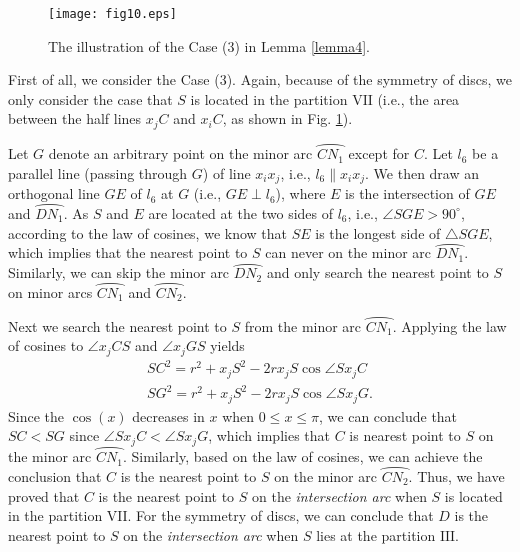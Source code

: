 \documentclass[journal]{IEEEtran}
\begin{document}
\begin{IEEEproof}
\begin{figure}
\begin{center}
\texttt{[image: fig10.eps]}    \caption{The illustration of the Case (3) in Lemma \ref{lemma4}.}
\label{fig10}                                 \end{center}                                 \end{figure}
First of all, we consider the Case (3). Again, because of the symmetry of discs, we only consider the case that $S$ is located in the
partition $\mathrm{VII}$ (i.e., the area between the half lines $x_jC$ and $x_iC$, as shown in Fig. \ref{fig10}).

Let $G$ denote an arbitrary point on the minor arc $\wideparen{CN_1}$ except for $C$. Let $l_6$ be a parallel line (passing through $G$)
of line $x_ix_j$, i.e., $l_6\parallel x_ix_j$. We then draw an orthogonal line $GE$ of $l_6$ at $G$ (i.e., $GE\perp l_6$), where $E$ is
the intersection of $GE$ and $\wideparen{DN_1}$. As $S$ and $E$ are located at the two sides of $l_6$, i.e., $\angle SGE > 90^{\circ}$,
according to the law of cosines, we know that $SE$ is the longest side of $\triangle SGE$, which implies that the nearest point to $S$ can
never on the minor arc $\wideparen{DN_1}$. Similarly, we can skip the minor arc $\wideparen{DN_2}$ and only search the nearest point to
$S$ on minor arcs $\wideparen{CN_1}$ and $\wideparen{CN_2}$.

Next we search the nearest point to $S$ from the minor arc $\wideparen{CN_1}$. Applying the law of cosines to $\angle x_jCS$ and $\angle x_jGS$
yields
\begin{equation}\label{equ19}
\begin{array}{l}
S{C^2} = {r^2} + {x_j}{S^2} - 2r{x_j}S\cos \angle S{x_j}C\\
S{G^2} = {r^2} + {x_j}{S^2} - 2r{x_j}S\cos \angle S{x_j}G.
\end{array}
\end{equation}
Since the $\cos(x)$ decreases in $x$ when $0\leq x\leq \pi$, we can conclude that $SC<SG$ since $\angle Sx_jC<\angle Sx_jG$, which implies
that $C$ is nearest point to $S$ on the minor arc $\wideparen{CN_1}$. Similarly, based on the law of cosines, we can achieve the conclusion that
$C$ is the nearest point to $S$ on the minor arc $\wideparen{CN_2}$. Thus, we have proved that $C$ is the nearest point to $S$ on the
\emph{intersection arc} when $S$ is located in the partition $\mathrm{VII}$. For the symmetry of discs, we can conclude that $D$ is the nearest point
to $S$ on the \emph{intersection arc} when $S$ lies at the partition $\mathrm{III}$.


\end{IEEEproof}
\end{document}
